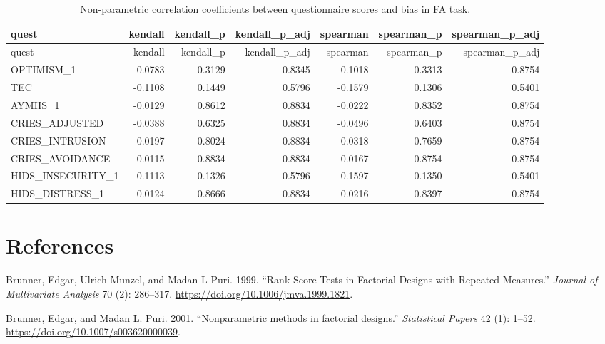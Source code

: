 \documentclass[]{article}
\begin{document}
\begin{longtable}[]{@{}lrrrrrr@{}}
\caption{Non-parametric correlation coefficients between questionnaire
scores and bias in FA task.}\tabularnewline
\toprule
quest & kendall & kendall\_p & kendall\_p\_adj & spearman & spearman\_p
& spearman\_p\_adj\tabularnewline
\midrule
\endfirsthead
\toprule
quest & kendall & kendall\_p & kendall\_p\_adj & spearman & spearman\_p
& spearman\_p\_adj\tabularnewline
\midrule
\endhead
OPTIMISM\_1 & -0.0783 & 0.3129 & 0.8345 & -0.1018 & 0.3313 &
0.8754\tabularnewline
TEC & -0.1108 & 0.1449 & 0.5796 & -0.1579 & 0.1306 &
0.5401\tabularnewline
AYMHS\_1 & -0.0129 & 0.8612 & 0.8834 & -0.0222 & 0.8352 &
0.8754\tabularnewline
CRIES\_ADJUSTED & -0.0388 & 0.6325 & 0.8834 & -0.0496 & 0.6403 &
0.8754\tabularnewline
CRIES\_INTRUSION & 0.0197 & 0.8024 & 0.8834 & 0.0318 & 0.7659 &
0.8754\tabularnewline
CRIES\_AVOIDANCE & 0.0115 & 0.8834 & 0.8834 & 0.0167 & 0.8754 &
0.8754\tabularnewline
HIDS\_INSECURITY\_1 & -0.1113 & 0.1326 & 0.5796 & -0.1597 & 0.1350 &
0.5401\tabularnewline
HIDS\_DISTRESS\_1 & 0.0124 & 0.8666 & 0.8834 & 0.0216 & 0.8397 &
0.8754\tabularnewline
\bottomrule
\end{longtable}

\newpage

\hypertarget{references}{%
\section*{References}\label{references}}

\hypertarget{refs}{}
\leavevmode\hypertarget{ref-Brunner1999}{}%
Brunner, Edgar, Ulrich Munzel, and Madan L Puri. 1999. ``Rank-Score
Tests in Factorial Designs with Repeated Measures.'' \emph{Journal of
Multivariate Analysis} 70 (2): 286--317.
\url{https://doi.org/10.1006/jmva.1999.1821}.

\leavevmode\hypertarget{ref-Brunner2001}{}%
Brunner, Edgar, and Madan L. Puri. 2001. ``Nonparametric methods in
factorial designs.'' \emph{Statistical Papers} 42 (1): 1--52.
\url{https://doi.org/10.1007/s003620000039}.
\end{document}
